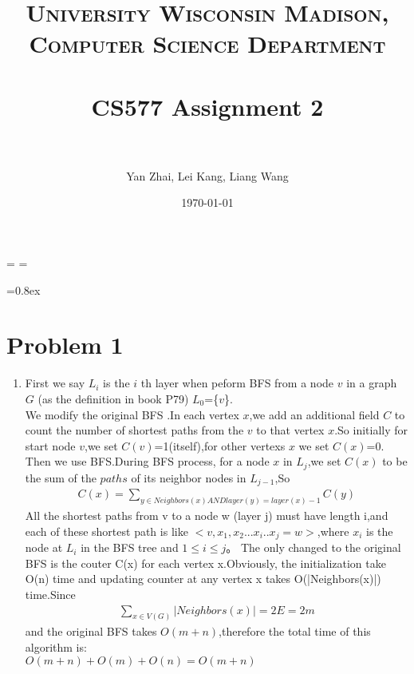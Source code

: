 \documentclass[paper=a4, fontsize=11pt]{scrartcl} %
\title{	
\normalfont \normalsize 
\textsc{University Wisconsin Madison, Computer Science Department} \\ [25pt] %
\horrule{0.5pt} \\[0.4cm] %
\huge CS577 Assignment 2\\ %
\horrule{2pt} \\[0.5cm] %
}
\author{Yan Zhai, Lei Kang, Liang Wang} %
\date{\normalsize\today} %
\numberwithin{equation}{section} %
\numberwithin{figure}{section} %
\numberwithin{table}{section} %
\begin{document}
\maketitle %

\singlespacing
\newdimen\origiwspc%
\newdimen\origiwstr%
\origiwspc=\font%
\origiwstr=\font

\font=0.8ex

\section*{Problem 1}

\begin{enumerate}[label={1.\arabic*}]
  \item 
First we say  $L_{i}$ is the ${i}$ th layer when peform BFS from a node ${v}$ in a graph ${G}$ (as the definition in book P79) $L_{0}$=\{${v}$\}.\\
We modify the original BFS .In each vertex ${x}$,we add an additional field ${C}$ to count the number of shortest paths from the ${v}$ to that vertex ${x}$.So initially for start node ${v}$,we set ${C(v)}$=1(itself),for other vertexs ${x}$
we set ${C(x)}$=0.\\
Then we use BFS.During BFS process, for a node ${x}$ in $L_{j}$,we set ${C(x)}$ to be the sum of the ${paths}$ of its neighbor nodes in $L_{j-1}$,So
\begin{align*}
 C(x) = \sum_{y \in Neighbors(x)  AND  layer(y)=layer(x)-1 } C(y)
\end{align*}
All the shortest paths from v to a node w (layer j) must have length i,and each of these shortest path is like
${<v,x_1,x_2...x_i..x_j=w>}$,where ${x_i}$ is the node at ${L_i}$ in the BFS tree and ${1 \leq i \leq j}$。
The only changed to the original BFS is the couter C(x) for each vertex x.Obviously, the initialization take O(n)
time and updating counter at any vertex x takes O(|Neighbors(x)|) time.Since 
\begin{align*}
\sum_{x \in V(G) } |Neighbors(x)|=2E=2m
\end{align*}
and the original BFS takes ${O(m+n)}$,therefore the total time of this algorithm is:\\
${O(m+n)+O(m)+O(n)=O(m+n)}$

\end{enumerate}
\end{document}

